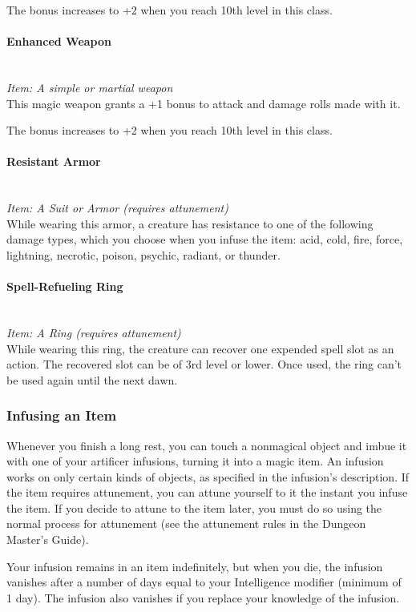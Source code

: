 \documentclass[letterpaper,openany,oneside,twocolumn]{book}
\begin{document}
The bonus increases to +2 when you reach 10th level in this class.
\paragraph*{Enhanced Weapon}\hfill\\
\textit{Item: A simple or martial weapon}\\
This magic weapon grants a +1 bonus to attack and damage rolls made with it.

The bonus increases to +2 when you reach 10th level in this class.
\paragraph*{Resistant Armor}\hfill\\
\textit{Item: A Suit or Armor (requires attunement)}\\
While wearing this armor, a creature has resistance to one of the following damage types, which you choose when you infuse the item: acid, cold, fire, force, lightning, necrotic, poison, psychic, radiant, or thunder.
\paragraph*{Spell-Refueling Ring}\hfill\\
\textit{Item: A Ring (requires attunement)}\\
While wearing this ring, the creature can recover one expended spell slot as an action. The recovered slot can be of 3rd level or lower. Once used, the ring can't be used again until the next dawn.
\subsubsection*{Infusing an Item}
Whenever you finish a long rest, you can touch a nonmagical object and imbue it with one of your artificer infusions, turning it into a magic item. An infusion works on only certain kinds of objects, as specified in the infusion's description. If the item requires attunement, you can attune yourself to it the instant you infuse the item. If you decide to attune to the item later, you must do so using the normal process for attunement (see the attunement rules in the Dungeon Master's Guide).

Your infusion remains in an item indefinitely, but when you die, the infusion vanishes after a number of days equal to your Intelligence modifier (minimum of 1 day). The infusion also vanishes if you replace your knowledge of the infusion.
\end{document}
